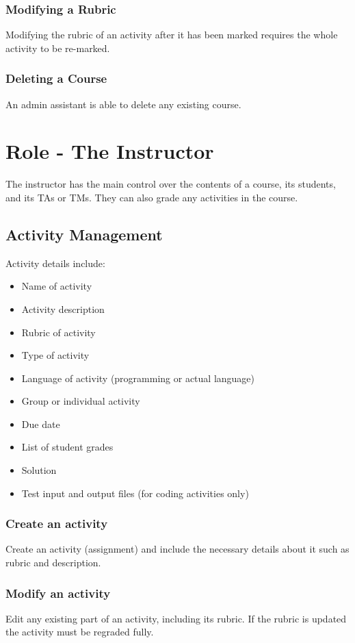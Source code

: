 \documentclass{article}
\begin{document}
\subsubsection{Modifying a Rubric}
Modifying the rubric of an activity after it has been marked requires the whole
activity to be re-marked.
\subsubsection{Deleting a Course}
An admin assistant is able to delete any existing course.

\section{Role - The Instructor \label{Instructor}}
The instructor has the main control over the contents of a course, its students, 
and its TAs or TMs. They can also grade any activities in the course.
\subsection{Activity Management \label{ActivityManagement}}
Activity details include:
\begin {itemize}
	\item Name of activity
	\item Activity description
	\item Rubric of activity
	\item Type of activity
	\item Language of activity (programming or actual language)
	\item Group or individual activity
	\item Due date
	\item List of student grades
	\item Solution
	\item Test input and output files (for coding activities only)
\end {itemize}
\subsubsection{Create an activity \label{CreateAct}}
Create an activity (assignment) and include the necessary details about it such 
as rubric and description.
\subsubsection{Modify an activity \label{ModifyAct}}
Edit any existing part of an activity, including its rubric. If the rubric is updated
the activity must be regraded fully.
\end{document}
